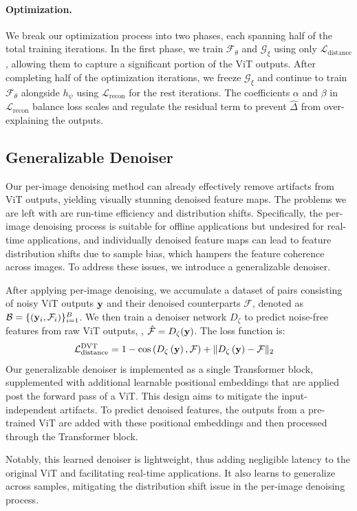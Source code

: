\paragraph{Optimization.} We break our optimization process into two phases, each spanning half of the total training iterations. In the first phase, we train $\mathcal{F}_\theta$ and $\mathcal{G}_{\xi}$ using only $\mathcal{L}_{\text{distance}}$, allowing them to capture a significant portion of the ViT outputs. After completing half of the optimization iterations, we freeze $\mathcal{G}_\xi$ and continue to train $\mathcal{F}_\theta$ alongside $h_\psi$ using $\mathcal{L}_\text{recon}$ for the rest iterations. The coefficients $\alpha$ and $\beta$ in $\mathcal{L}_\text{recon}$ balance loss scales and regulate the residual term to prevent $\widehat{\Delta}$ from over-explaining the outputs.

\subsection{Generalizable Denoiser}
\label{sec:gen_denoiser}
Our per-image denoising method can already effectively remove artifacts from ViT outputs, yielding visually stunning denoised feature maps. The problems we are left with are run-time efficiency and distribution shifts. Specifically, the per-image denoising process is suitable for offline applications but undesired for real-time applications, and individually denoised feature maps can lead to feature distribution shifts due to sample bias, which hampers the feature coherence across images. To address these issues, we introduce a generalizable denoiser.

After applying per-image denoising, we accumulate a dataset of pairs consisting of noisy ViT outputs $\vb{y}$ and their denoised counterparts $\mathcal{F}$, denoted as $\mathcal{B}=\{\left(\vb{y}_i, \mathcal{F}_i\right)\}_{i=1}^B$. We then train a denoiser network  ${D}_\zeta$ to predict noise-free features from raw ViT outputs, \ie, $\hat{\mathcal{F}} = D_\zeta(\vb{y})$. The loss function is:
\begin{align}
    \mathcal{L}_{\text{distance}}^\text{DVT} & = 1 - \cos\left(D_\zeta\left(\vb{y}\right), \mathcal{F}\right) + \|D_\zeta\left(\vb{y}\right) - \mathcal{F} \|_2 \label{eq:gen_loss}
\end{align}
Our generalizable denoiser is implemented as a single Transformer block, supplemented with additional learnable positional embeddings that are applied post the forward pass of a ViT. This design aims to mitigate the input-independent artifacts. To predict denoised features, the outputs from a pre-trained ViT are added with these positional embeddings and then processed through the Transformer block.

Notably, this learned denoiser is lightweight, thus adding negligible latency to the original ViT and facilitating real-time applications. It also learns to generalize across samples, mitigating the distribution shift issue in the per-image denoising process.



